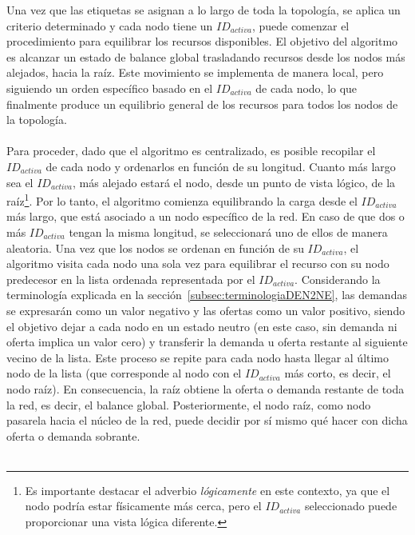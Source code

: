 Una vez que las etiquetas se asignan a lo largo de toda la topología, se aplica un criterio determinado y cada nodo tiene un $ID_{activa}$, puede comenzar el procedimiento para equilibrar los recursos disponibles. El objetivo del algoritmo es alcanzar un estado de balance global trasladando recursos desde los nodos más alejados, hacia la raíz. Este movimiento se implementa de manera local, pero siguiendo un orden específico basado en el $ID_{activa}$ de cada nodo, lo que finalmente produce un equilibrio general de los recursos para todos los nodos de la topología. \\
\\
Para proceder, dado que el algoritmo es centralizado, es posible recopilar el $ID_{activa}$ de cada nodo y ordenarlos en función de su longitud. Cuanto más largo sea el $ID_{activa}$, más alejado estará el nodo, desde un punto de vista lógico, de la raíz\footnote{Es importante destacar el adverbio \textit{lógicamente} en este contexto, ya que el nodo podría estar físicamente más cerca, pero el $ID_{activa}$ seleccionado puede proporcionar una vista lógica diferente.}. Por lo tanto, el algoritmo comienza equilibrando la carga desde el $ID_{activa}$ más largo, que está asociado a un nodo específico de la red. En caso de que dos o más $ID_{activa}$ tengan la misma longitud, se seleccionará uno de ellos de manera aleatoria. Una vez que los nodos se ordenan en función de su $ID_{activa}$, el algoritmo visita cada nodo una sola vez para equilibrar el recurso con su nodo predecesor en la lista ordenada representada por el $ID_{activa}$. Considerando la terminología explicada en la sección~\ref{subsec:terminologiaDEN2NE}, las demandas se expresarán como un valor negativo y las ofertas como un valor positivo, siendo el objetivo dejar a cada nodo en un estado neutro (en este caso, sin demanda ni oferta implica un valor cero) y transferir la demanda u oferta restante al siguiente vecino de la lista. Este proceso se repite para cada nodo hasta llegar al último nodo de la lista (que corresponde al nodo con el $ID_{activa}$ más corto, es decir, el nodo raíz). En consecuencia, la raíz obtiene la oferta o demanda restante de toda la red, es decir, el balance global. Posteriormente, el nodo raíz, como nodo pasarela hacia el núcleo de la red, puede decidir por sí mismo qué hacer con dicha oferta o demanda sobrante. \\
\\
